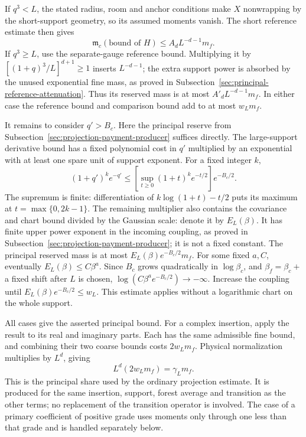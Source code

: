 If $q^3<L$, the stated radius, room and anchor conditions make $X$
nonwrapping by the short-support geometry, so
its assumed moments vanish. The short reference estimate then gives
\[
                    \mathfrak m_c(\text{bound of }H)
                         \le A_dL^{-d-1}m_f.
\]
If $q^3\ge L$, use the separate-gauge reference bound. Multiplying
it by $[(1+q)^3/L]^{d+1}\ge1$ inserts $L^{-d-1}$; the extra support
power is absorbed by the unused exponential fine mass, as proved in
Subsection~\ref{sec:principal-reference-attenuation}. Thus its reserved
mass is at most $A'_dL^{-d-1}m_f$. In either case the reference
bound and comparison bound add to at most $w_Lm_f$.

It remains to consider $q'>B_c$. Here the principal reserve from
Subsection~\ref{sec:projection-payment-producer} suffices directly.
The large-support derivative bound has a fixed polynomial cost in
$q'$ multiplied by an exponential with at least one spare unit of
support exponent. For a fixed integer $k$,
\[
 (1+q')^k e^{-q'}
 \le \left[\sup_{t\ge0}(1+t)^k e^{-t/2}\right]e^{-B_c/2}.
\]
The supremum is finite: differentiation of
$k\log(1+t)-t/2$ puts its maximum at $t=\max\{0,2k-1\}$.
The remaining multiplier also contains the covariance and chart
bound divided by the Gaussian scale: denote it by $E_L(\beta)$.
It has finite upper power exponent in the incoming coupling, as
proved in Subsection~\ref{sec:projection-payment-producer}; it is
not a fixed constant. The principal reserved mass is at most
$E_L(\beta)e^{-B_c/2}m_f$. For some fixed $a,C$, eventually
$E_L(\beta)\le C\beta^a$. Since $B_c$ grows quadratically
in $\log\beta_c$, and $\beta_f=\beta_c+$ a fixed shift
after $L$ is chosen,
$\log(C\beta^a e^{-B_c/2})\to-\infty$. Increase the coupling
until $E_L(\beta)e^{-B_c/2}\le w_L$. This estimate applies without a logarithmic
chart on the whole support.

All cases give the asserted principal bound. For a complex insertion,
apply the result to its real and imaginary parts. Each has the same
admissible fine bound, and combining their two coarse bounds costs
$2w_Lm_f$. Physical normalization multiplies by $L^d$, giving
\[
                         L^d(2w_Lm_f)=\gamma_Lm_f.
\]
This is the principal share used by the ordinary projection estimate.
It is produced for the same insertion, support, forest average and
transition as the other terms; no replacement of the transition
operator is involved. The case of a primary coefficient of positive
grade uses moments only through one less than that grade and is
handled separately below.
